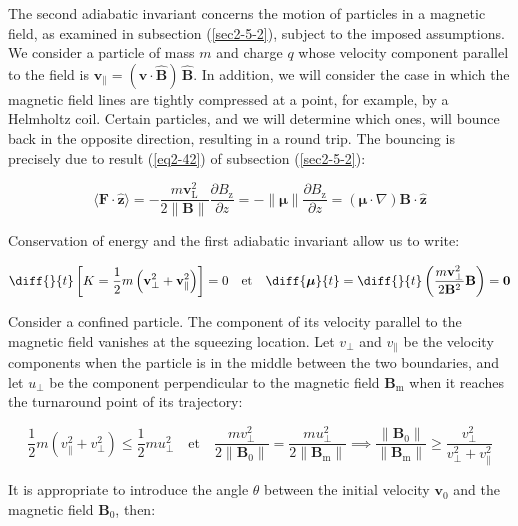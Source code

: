 \label{sec2-9-2}

The second adiabatic invariant concerns the motion of particles in a magnetic field, as examined in subsection (\ref{sec2-5-2}), subject to the imposed assumptions. We consider a particle of mass $m$ and charge $q$ whose velocity component parallel to the field is $\mathbf{v}_\parallel=(\mathbf{v}\cdot\mathbf{\hat{B}})\,\mathbf{\hat{B}}$. In addition, we will consider the case in which the magnetic field lines are tightly compressed at a point, for example, by a Helmholtz coil. Certain particles, and we will determine which ones, will bounce back in the opposite direction, resulting in a round trip. The bouncing is precisely due to result (\ref{eq2-42}) of subsection (\ref{sec2-5-2}):

\begin{equation}
    \langle\mathbf{F}\cdot\mathbf{\hat{z}}\rangle=-\frac{m\mathbf{v}_\text{L}^2}{2\|\mathbf{B}\|}\frac{\partial B_\text{z}}{\partial z}=-\|\boldsymbol{\mu}\|\frac{\partial B_\text{z}}{\partial z}=\left(\boldsymbol{\mu}\cdot\nabla\right)\mathbf{B}\cdot\mathbf{\hat{z}}
\end{equation}

Conservation of energy and the first adiabatic invariant allow us to write:

\begin{equation}
    \diff{}{t}\left[K=\frac{1}{2}m\left(\mathbf{v}_{\perp}^2+\mathbf{v}_\parallel^2\right)\right]=0\quad\text{et}\quad\diff{\boldsymbol{\mu}}{t}=\diff{}{t}\left(\frac{m\mathbf{v}_\perp^2}{2\mathbf{B}^2}\mathbf{B}\right)=\mathbf{0}
\end{equation}

Consider a confined particle. The component of its velocity parallel to the magnetic field vanishes at the squeezing location. Let $v_\perp$ and $v_\parallel$ be the velocity components when the particle is in the middle between the two boundaries, and let $u_\perp$ be the component perpendicular to the magnetic field $\mathbf{B}_\text{m}$ when it reaches the turnaround point of its trajectory:

\begin{equation}
    \frac{1}{2}m(v_{\parallel}^2+v_\perp^2)\leq\frac{1}{2}mu_\perp^2\quad\text{et}\quad\frac{mv_\perp^2}{2\|\mathbf{B}_0\|}=\frac{mu_\perp^2}{2\|\mathbf{B}_\text{m}\|}\implies\frac{\|\mathbf{B}_0\|}{\|\mathbf{B}_\text{m}\|}\geq\frac{v_\perp^2}{v_\perp^2+v_\parallel^2}
\end{equation}

It is appropriate to introduce the angle $\theta$ between the initial velocity $\mathbf{v}_0$ and the magnetic field $\mathbf{B}_0$, then:

